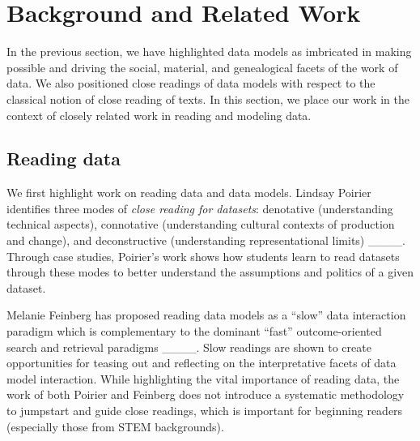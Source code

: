 \section{Background and Related Work}
\label{sec:background}

In the previous section, we have highlighted data models as imbricated in making possible and driving the social, material, and genealogical facets of the work of data.  We also positioned close readings of data models with respect to the classical notion of close reading of texts.  In this section, we place our work in the context of closely related work in reading and modeling data.

\subsection{Reading data}

We first highlight work on reading data and data models.
Lindsay Poirier identifies three modes of \emph{close reading for datasets}: denotative (understanding technical aspects), connotative (understanding cultural contexts of production and change), and deconstructive (understanding representational limits) ____.
Through case studies, Poirier's work shows how students learn to read datasets through these modes to better understand the assumptions and politics of a given dataset.  

Melanie Feinberg has proposed reading data models as a ``slow'' data interaction paradigm which is complementary to the dominant ``fast'' outcome-oriented search and retrieval paradigms ____.   Slow readings are shown to create opportunities for teasing out and reflecting on the interpretative facets of data model interaction.
While highlighting the vital importance of reading data, the work of both Poirier and Feinberg does not introduce a systematic methodology to jumpstart and guide close readings, which is important for beginning readers (especially those from STEM backgrounds). 

